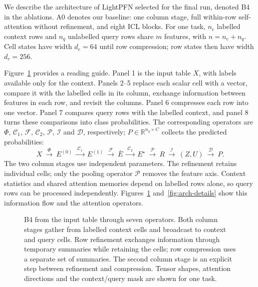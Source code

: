\documentclass[11pt]{article}
\newcommand{\R}{\mathbb{R}}
\begin{document}
We describe the architecture of LightPFN selected for the final run, denoted B4 in the ablations.
A0 denotes our baseline: one column stage, full within-row self-attention without refinement,
and eight ICL blocks. For one task, $n_c$ labelled context
rows and $n_q$ unlabelled query rows share $m$ features, with $n=n_c+n_q$. Cell states have width
$d_e=64$ until row compression; row states then have width $d_r=256$.

Figure~\ref{fig:arch} provides a reading guide. Panel 1 is the input table $X$, with labels available
only for the context. Panels 2--5 replace each scalar cell with a vector, compare it with the labelled
cells in its column, exchange information between features in each row, and revisit the columns.
Panel 6 compresses each row into one vector. Panel 7 compares query rows with the labelled context,
and panel 8 turns these comparisons into class probabilities. The corresponding operators are
$\Phi$, $\mathcal{C}_1$, $\mathcal{F}$, $\mathcal{C}_2$, $\mathcal{P}$, $\mathcal{I}$ and
$\mathcal{D}$, respectively; $P\in\R^{n_q\times C}$ collects the predicted probabilities:
\begin{equation}
X\ \xrightarrow{\ \Phi\ }\ E^{(0)}
\ \xrightarrow{\ \mathcal{C}_1\ }\ E^{(1)}
\ \xrightarrow{\ \mathcal{F}\ }\ \bar E
\ \xrightarrow{\ \mathcal{C}_2\ }\ E^{\star}
\ \xrightarrow{\ \mathcal{P}\ }\ R
\ \xrightarrow{\ \mathcal{I}\ }\ (Z,U)
\ \xrightarrow{\ \mathcal{D}\ }\ P.
\label{eq:architecture}
\end{equation}
The two column stages use independent parameters. The refinement retains individual cells;
only the pooling operator $\mathcal{P}$ removes the feature axis. Context statistics and shared
attention memories depend on labelled rows alone, so query rows can be processed independently.
Figures~\ref{fig:arch} and~\ref{fig:arch-details} show this information flow and the attention operators.

\begin{figure}[tbp]
\centering
\resizebox{\linewidth}{!}{}
\caption{B4 from the input table through seven operators. Both column stages gather from labelled context
cells and broadcast to context and query cells. Row refinement exchanges information through
temporary summaries while retaining the cells; row compression uses a separate set of summaries.
The second column stage is an explicit step between refinement and compression. Tensor shapes,
attention directions and the context/query mask are shown for one task.}
\label{fig:arch}
\end{figure}
\end{document}
